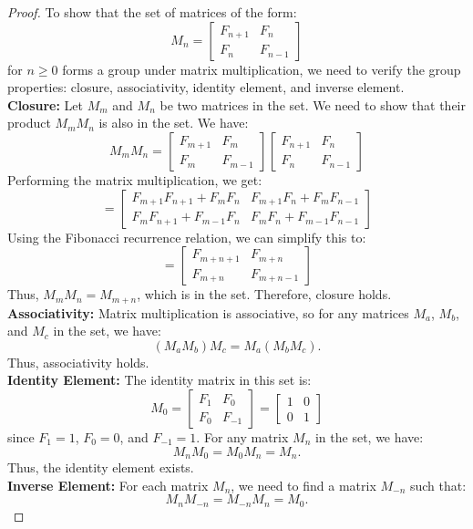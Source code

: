 \documentclass[openany]{book}
\begin{document}
\begin{proof}
    To show that the set of matrices of the form:
    \[
        M_n = \begin{bmatrix}F_{n+1} & F_n \\ F_n & F_{n-1} \end{bmatrix}
    \]
    for $n \geq 0$ forms a group under matrix multiplication, we need to verify the group properties: closure, associativity, identity element, and inverse element. \\
    \textbf{Closure:} Let $M_m$ and $M_n$ be two matrices in the set. We need to show that their product $M_m M_n$ is also in the set. We have:
    \[
        M_m M_n = \begin{bmatrix}F_{m+1} & F_m \\ F_m & F_{m-1} \end{bmatrix} \begin{bmatrix}F_{n+1} & F_n \\ F_n & F_{n-1} \end{bmatrix}
    \]
    Performing the matrix multiplication, we get:
    \[
        = \begin{bmatrix}F_{m+1}F_{n+1} + F_m F_n & F_{m+1}F_n + F_m F_{n-1} \\ F_m F_{n+1} + F_{m-1}F_n & F_m F_n + F_{m-1}F_{n-1} \end{bmatrix}
    \]
    Using the Fibonacci recurrence relation, we can simplify this to:
    \[
        = \begin{bmatrix}F_{m+n+1} & F_{m+n} \\ F_{m+n} & F_{m+n-1} \end{bmatrix}
    \]
    Thus, $M_m M_n = M_{m+n}$, which is in the set. Therefore, closure holds. \\
    \textbf{Associativity:} Matrix multiplication is associative, so for any matrices $M_a$, $M_b$, and $M_c$ in the set, we have:
    \[
        (M_a M_b) M_c = M_a (M_b M_c).
    \]
    Thus, associativity holds. \\
    \textbf{Identity Element:} The identity matrix in this set is:
    \[
        M_0 = \begin{bmatrix}F_1 & F_0 \\ F_0 & F_{-1} \end{bmatrix} = \begin{bmatrix}1 & 0 \\ 0 & 1 \end{bmatrix}
    \]
    since $F_1 = 1$, $F_0 = 0$, and $F_{-1} = 1$. For any matrix $M_n$ in the set, we have:
    \[
        M_n M_0 = M_0 M_n = M_n.
    \]
    Thus, the identity element exists. \\
    \textbf{Inverse Element:} For each matrix $M_n$, we need to find a matrix $M_{-n}$ such that:
    \[        M_n M_{-n} = M_{-n} M_n = M_0.
    \]
\end{proof}
\end{document}
